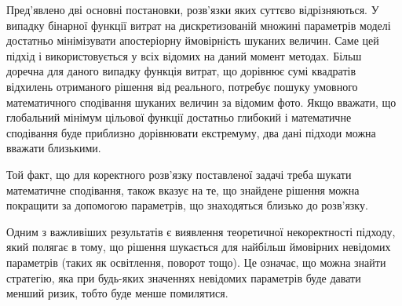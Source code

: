 \chapterConclusion

Пред'явлено дві основні постановки, розв'язки яких суттєво відрізняються.
У випадку бінарної функції витрат на дискретизованій множині параметрів моделі
достатньо мінімізувати апостеріорну ймовірність шуканих величин.
Саме цей підхід і використовується у всіх відомих на даний момент методах.
Більш доречна для даного випадку функція витрат,
що дорівнює сумі квадратів відхилень отриманого рішення від реального,
потребує пошуку умовного математичного сподівання
шуканих величин за відомим фото.
Якщо вважати,
що глобальний мінімум цільової функції достатньо глибокий
і математичне сподівання буде приблизно дорівнювати екстремуму,
два дані підходи можна вважати близькими.

Той факт,
що для коректного розв'язку поставленої задачі треба шукати
математичне сподівання,
також вказує на те,
що знайдене рішення можна покращити за допомогою параметрів,
що знаходяться близько до розв'язку.

Одним з важливіших результатів є виявлення теоретичної некоректності підходу,
який полягає в тому,
що рішення шукається для найбільш ймовірних невідомих параметрів
(таких як освітлення, поворот тощо).
Це означає, що можна знайти стратегію,
яка при будь-яких значеннях невідомих параметрів буде давати менший ризик,
тобто буде менше помилятися.
